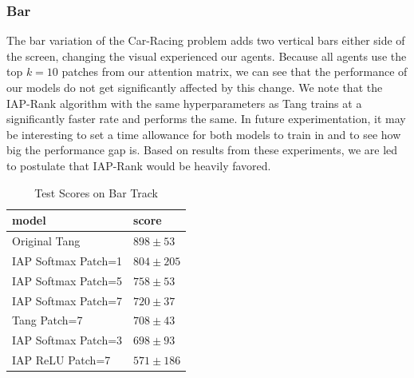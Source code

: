 \documentclass[10pt,twocolumn,letterpaper]{article}
\begin{document}
\subsubsection{Bar}
The bar variation of the Car-Racing problem adds two vertical bars either side of the 
screen, changing the visual experienced our agents. Because all agents use the top $k=10$ 
patches from our attention matrix, we can see that the performance of our models do not 
get significantly affected by this change. We note that the IAP-Rank algorithm with
the same hyperparameters as Tang trains at a significantly faster rate and performs 
the same. In future experimentation, it may be interesting to 
set a time allowance for both models to train in and to see how big the performance gap 
is. Based on results from these experiments, we are led to postulate that IAP-Rank would
be heavily favored.
\begin{table}[h]
\centering
\caption{\label{tab:blob}Test Scores on Bar Track}
\begin{tabular}{|l|l|}
\hline
model               & score \\ \hline
Original Tang       & $898 \pm 53$  \\ \hline
IAP Softmax Patch=1 & $804 \pm 205$  \\ \hline
IAP Softmax Patch=5 & $758 \pm 53$  \\ \hline
IAP Softmax Patch=7 & $720 \pm 37$   \\ \hline
Tang Patch=7        & $708 \pm 43$   \\ \hline
IAP Softmax Patch=3 & $698 \pm 93$  \\ \hline
IAP ReLU Patch=7    & $571 \pm 186$  \\ \hline
\end{tabular}
\end{table}
\end{document}
